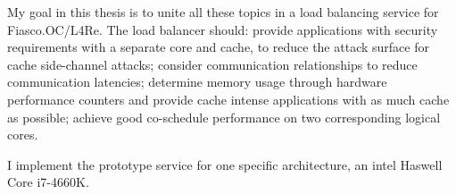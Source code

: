 My goal in this thesis is to unite all these topics in a load balancing
service for Fiasco.OC/L4Re.
The load balancer should: provide applications with security requirements with
a separate core and cache, to reduce the attack surface for cache side-channel
attacks;
consider communication relationships to reduce communication latencies;
determine memory usage through hardware performance counters and provide cache
intense applications with as much cache as possible;
achieve good co-schedule performance on two corresponding logical cores.

I implement the prototype service for one specific architecture, an \gls{intel}
Haswell Core i7-4660K.



\begin{comment}

\begin{itemize}
  \item introduction to relevant terminology
  \item SMT, symbiotic scheduling, co-schedule, measurement difficulties
  \item Congestion awareness of shared resources; Goal minimal slowdown for all
    applications; fairness, cache weights, pain metric, reliance on default
    scheduler, performance counters
  \item communication awareness: compute-communicate cycle, distribution of one
    application
  \item don't haves: No CMP architecture -> SMT-SMP combination; client server
    communication model;
  \item Fiasco.OC: no logic, just mechanisms in the kernel, hence no balancing;
  \item L4Re: no automatic, behaviour based balancing.
  \item do: communication models: HPC, CL-SVR; behaviour analysis: perf
    counters; SMT-SMP processor awareness, reduced conflicts in shared hardware
    resources, only on-line measurements;
  \item secure/real-time/exclusive core design.
\end{itemize}


\begin{itemize}
  \item Current processor architectures don't use CMP processors any more, therefore
    the cache layout is different. My work evaluates the research results on the
    new HW layout. But AMD Opteron Barcelona had a similar cache layout.
  \item User level scheduling on a $µ$-kernel. But user level scheduling was
    done before.
  \item More scheduling parameters \textit{or} less assumptions about threads.
  \item No off-line measurements, only on-line information gathering.
  \item Thread interaction possible (communication partner, security flag)
  \item Designated cores for security critical applications.
\end{itemize}

\end{comment}

